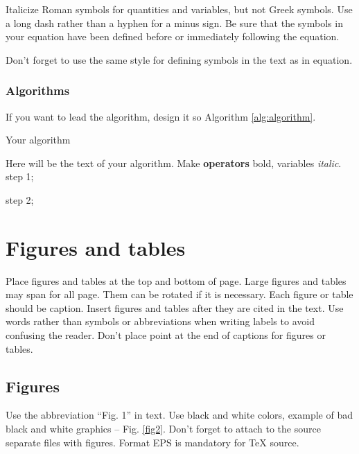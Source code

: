 Italicize Roman symbols for quantities and variables, but not Greek symbols. Use a long dash rather than a hyphen for a minus sign. Be sure that the symbols in your equation have been defined before or immediately following the equation.

Don't forget to use the same style for defining symbols in the text as in equation.

\subsubsection{Algorithms}
If you want to lead the algorithm, design it so Algorithm \ref{alg:algorithm}.

\begin{algorithm}
	\caption{Your algorithm}\label{alg:algorithm}
	\begin{algorithmic}
		
		\item Here will be the text of your algorithm. Make \textbf{operators} bold, variables \textit{italic}. step 1;
		\item step 2;
	\end{algorithmic}
\end{algorithm}

\section{Figures and tables}
Place figures and tables at the top and bottom of  page. Large figures and tables may span for all page. Them can be rotated if it is necessary. Each figure or table should be caption. Insert figures and tables after they are cited in the text. Use words rather than symbols or abbreviations when writing labels to avoid confusing the reader. Don't place point at the end of captions for figures or tables. 

\subsection{Figures}
Use the abbreviation ``Fig. 1'' in text. Use black and white colors, example of bad black and white graphics -- Fig. \ref{fig2}. Don't forget to attach to the source separate files with figures. Format EPS is mandatory for TeX source.
%

